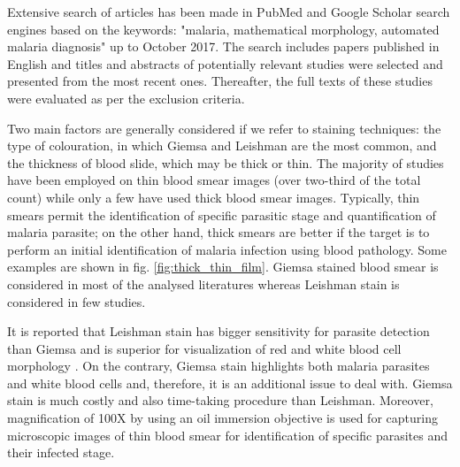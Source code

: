 \documentclass[sensors,review,submit,moreauthors,pdftex,10pt,a4paper]{mdpi}
\begin{document}
	Extensive search of articles has been made in PubMed and Google Scholar search engines based on the keywords: "malaria, mathematical morphology, automated malaria diagnosis" up to October  2017. The search includes papers published in English and titles and abstracts of potentially relevant studies were selected and presented from the most recent ones. Thereafter, the full texts of these studies were evaluated as per the exclusion criteria.
	
	
	Two main factors are generally considered if we refer to staining techniques: the type of colouration, in which Giemsa and Leishman are the most common, and the thickness of blood slide, which may be thick or thin.
	The majority of studies have been employed on thin blood smear images (over two-third of the total count) while only a few have used thick blood smear images.
	Typically, thin smears permit the identification of specific parasitic stage and quantification of malaria parasite; on the other hand, thick smears are better if the target is to perform an initial identification of malaria infection using blood pathology. Some examples are shown in fig. \ref{fig:thick_thin_film}.
	Giemsa stained blood smear is considered in most of the analysed literatures whereas Leishman stain is considered in few studies. %
	
	It is reported that Leishman stain has bigger sensitivity for parasite detection than Giemsa \cite{Khan2014} and is superior for visualization of red and white blood cell morphology \cite{Sathpathi2014}. On the contrary, Giemsa stain highlights both malaria parasites and white blood cells and, therefore, it is an additional issue to deal with.
	Giemsa stain is much costly and also time-taking procedure than Leishman.
	Moreover, magnification of 100X by using an oil immersion objective is used for capturing microscopic images of thin blood smear for identification of specific parasites and their infected stage.
	
\end{document}

